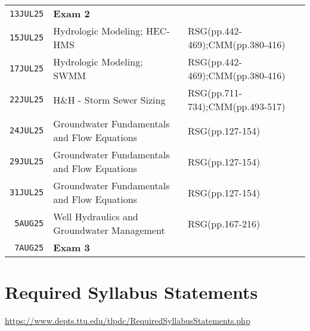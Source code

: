 \documentclass[12pt]{article}
\begin{document}
\begin{table}[ht!]
\begin{tabular}{p{0.5in}p{3.0in}p{3.0in}}
\texttt{13JUL25} & \textbf{Exam 2} &  \\ %
\texttt{15JUL25} & Hydrologic Modeling; HEC-HMS & RSG(pp.442-469);CMM(pp.380-416)\\ %
\texttt{17JUL25} & Hydrologic Modeling; SWMM & RSG(pp.442-469);CMM(pp.380-416) \\ %
\texttt{22JUL25} & H\&H - Storm Sewer Sizing &RSG(pp.711-734);CMM(pp.493-517)  \\ %
\texttt{24JUL25} & Groundwater Fundamentals and Flow Equations & RSG(pp.127-154)\\ %
\texttt{29JUL25} & Groundwater Fundamentals and Flow Equations & RSG(pp.127-154)\\ %
\texttt{31JUL25} & Groundwater Fundamentals and Flow Equations & RSG(pp.127-154)  \\ %
\texttt{~5AUG25} & Well Hydraulics and Groundwater Management &  RSG(pp.167-216) \\  %
\texttt{~7AUG25} & \textbf{Exam 3} &  \\ %
\hline
   \end{tabular}
   \label{tab:schedule}
\end{table}


\clearpage
\clearpage
%

\section*{Required Syllabus Statements}
\url{https://www.depts.ttu.edu/tlpdc/RequiredSyllabusStatements.php}
\end{document}
